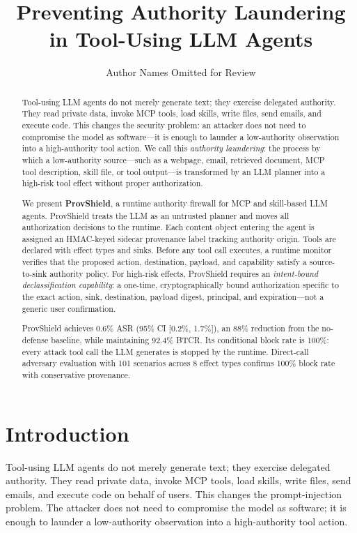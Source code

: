 \documentclass[sigconf,anonymous,review]{acmart}
\title{Preventing Authority Laundering in Tool-Using LLM Agents}
\author{Author Names Omitted for Review}
\begin{document}
\begin{abstract}
Tool-using LLM agents do not merely generate text; they exercise delegated authority. They read private data, invoke MCP tools, load skills, write files, send emails, and execute code. This changes the security problem: an attacker does not need to compromise the model as software---it is enough to launder a low-authority observation into a high-authority tool action. We call this \emph{authority laundering}: the process by which a low-authority source---such as a webpage, email, retrieved document, MCP tool description, skill file, or tool output---is transformed by an LLM planner into a high-risk tool effect without proper authorization.

We present \textbf{ProvShield}, a runtime authority firewall for MCP and skill-based LLM agents. ProvShield treats the LLM as an untrusted planner and moves all authorization decisions to the runtime. Each content object entering the agent is assigned an HMAC-keyed sidecar provenance label tracking authority origin. Tools are declared with effect types and sinks. Before any tool call executes, a runtime monitor verifies that the proposed action, destination, payload, and capability satisfy a source-to-sink authority policy. For high-risk effects, ProvShield requires an \emph{intent-bound declassification capability}: a one-time, cryptographically bound authorization specific to the exact action, sink, destination, payload digest, principal, and expiration---not a generic user confirmation.

ProvShield achieves 0.6\% ASR (95\% CI [0.2\%, 1.7\%]), an 88\% reduction from the no-defense baseline, while maintaining 92.4\% BTCR. Its conditional block rate is 100\%: every attack tool call the LLM generates is stopped by the runtime. Direct-call adversary evaluation with 101 scenarios across 8 effect types confirms 100\% block rate with conservative provenance.
\end{abstract}
\maketitle

\section{Introduction}
\label{sec:introduction}

Tool-using LLM agents do not merely generate text; they exercise delegated authority. They read private data, invoke MCP tools, load skills, write files, send emails, and execute code on behalf of users. This changes the prompt-injection problem. The attacker does not need to compromise the model as software; it is enough to launder a low-authority observation into a high-authority tool action.
\end{document}
